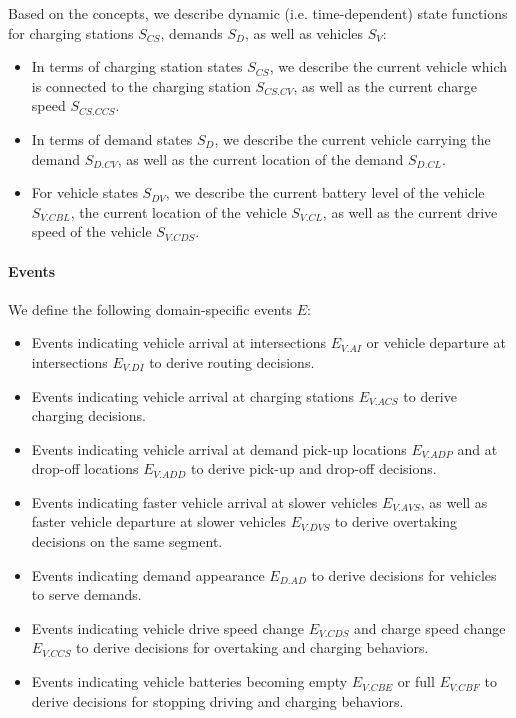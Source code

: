 \documentclass[a4paper,twoside]{article}
\begin{document}
	Based on the concepts, we describe dynamic (i.e. time-dependent) state functions for charging stations $S_{CS}$, demands $S_{D}$, as well as vehicles $S_V$:
	\begin{itemize}
		\item In terms of charging station states $S_{CS}$, we describe the current vehicle which is connected to the charging station $S_{CS.CV}$, as well as the current charge speed $S_{CS.CCS}$.
		\item In terms of demand states $S_{D}$, we describe the current vehicle carrying the demand $S_{D.CV}$, as well as the current location of the demand $S_{D.CL}$.
		\item For vehicle states $S_{DV}$, we describe the current battery level of the vehicle $S_{V.CBL}$, the current location of the vehicle $S_{V.CL}$, as well as the current drive speed of the vehicle $S_{V.CDS}$.
	\end{itemize}
	
	\paragraph{Events}
	
	We define the following domain-specific events $E$:
	\begin{itemize}
		\item Events indicating vehicle arrival at intersections $E_{V.AI}$ or vehicle departure at intersections $E_{V.DI}$ to derive routing decisions. 
		\item Events indicating vehicle arrival at charging stations $E_{V.ACS}$ to derive charging decisions. 
		\item Events indicating vehicle arrival at demand pick-up locations $E_{V.ADP}$ and at drop-off locations $E_{V.ADD}$ to derive pick-up and drop-off decisions. 
		\item Events indicating faster vehicle arrival at slower vehicles $E_{V.AVS}$, as well as faster vehicle departure at slower vehicles $E_{V.DVS}$ to derive overtaking decisions on the same segment.
		\item Events indicating demand appearance $E_{D.AD}$ to derive decisions for vehicles to serve demands.
		\item Events indicating vehicle drive speed change $E_{V.CDS}$ and charge speed change $E_{V.CCS}$ to derive decisions for overtaking and charging behaviors. 
		\item Events indicating vehicle batteries becoming empty $E_{V.CBE}$ or full $E_{V.CBF}$ to derive decisions for stopping driving and charging behaviors.
	\end{itemize}
\end{document}
